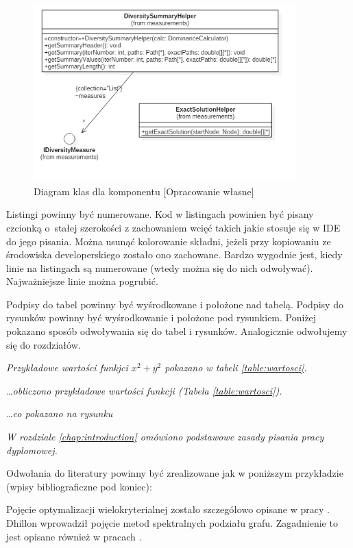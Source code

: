 \begin{figure}[h]\label{fig:miary}
\begin{center}
\includegraphics[width=4in]{img/kod/miary2.png}
\caption{Diagram klas dla komponentu [Opracowanie własne]}
\end{center}
\end{figure}

Listingi powinny być numerowane. Kod w listingach powinien być pisany czcionką o~stałej szerokości z zachowaniem wcięć takich jakie stosuje się w IDE do jego pisania. Można usunąć kolorowanie składni, jeżeli przy kopiowaniu ze środowiska developerskiego zostało ono zachowane. Bardzo wygodnie jest, kiedy linie na listingach są numerowane (wtedy można się do nich odwoływać). Najważniejsze linie można pogrubić. 

Podpisy do tabel powinny być wyśrodkowane i położone nad tabelą. Podpisy do rysunków powinny być wyśrodkowanie i położone pod rysunkiem. Poniżej pokazano sposób odwoływania się do tabel i rysunków. Analogicznie odwołujemy się do rozdziałów.

\textit{Przykładowe wartości funkjci $x^2+y^2$ pokazano w tabeli \ref{table:wartosci}.}

\textit{\dots obliczono przykładowe wartości funkcji (Tabela \ref{table:wartosci}).}

\textit{\dots co pokazano na rysunku }

\textit{W rozdziale \ref{chap:introduction} omówiono podstawowe zasady pisania pracy dyplomowej.}

Odwołania do literatury powinny być zrealizowane jak w poniższym przykładzie (wpisy bibliograficzne pod koniec):

Pojęcie optymalizacji wielokryterialnej zostało szczegółowo opisane w pracy \cite{warburton1987approximation}. Dhillon \cite{dhillon2001co} wprowadził pojęcie metod spektralnych podziału grafu. Zagadnienie to jest opisane również w pracach \cite{DBLP:conf/icaisc/2012-2, guo2008regionalization}.


